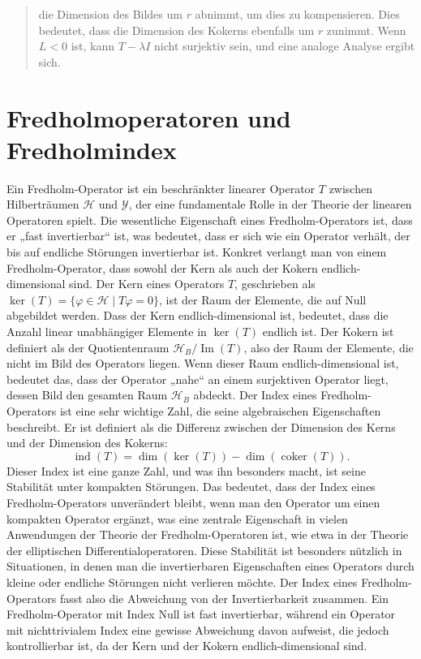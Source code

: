 \documentclass[11pt, hidelinks]{article}
\newcommand{\h}{\mathcal{H}}
\numberwithin{conj}{section}
\begin{document}
\begin{abstract}
die Dimension des Bildes um \(r\) abnimmt, um dies zu kompensieren. Dies bedeutet, dass die Dimension des Kokerns ebenfalls um \(r\) zunimmt. Wenn \(L < 0\) ist, kann \(T - \lambda I\) nicht surjektiv sein, und eine analoge Analyse ergibt sich.
\end{abstract}

\begin{Large}
\tableofcontents
\end{Large}

\onehalfspacing

\section{Fredholmoperatoren und Fredholmindex}
Ein Fredholm-Operator ist ein beschränkter linearer Operator \( T \) zwischen Hilberträumen \( \h \) und \( \mathcal{Y} \), der eine fundamentale Rolle in der Theorie der linearen Operatoren spielt. Die wesentliche Eigenschaft eines Fredholm-Operators ist, dass er „fast invertierbar“ ist, was bedeutet, dass er sich wie ein Operator verhält, der bis auf endliche Störungen invertierbar ist. Konkret verlangt man von einem Fredholm-Operator, dass sowohl der Kern als auch der Kokern endlich-dimensional sind. Der Kern eines Operators \( T \), geschrieben als \( \ker(T) = \{ \varphi \in \mathcal{H} \mid T\varphi = 0 \} \), ist der Raum der Elemente, die auf Null abgebildet werden. Dass der Kern endlich-dimensional ist, bedeutet, dass die Anzahl linear unabhängiger Elemente in \( \ker(T) \) endlich ist. Der Kokern ist definiert als der Quotientenraum \( \mathcal{H}_B / \operatorname{Im}(T) \), also der Raum der Elemente, die nicht im Bild des Operators liegen. Wenn dieser Raum endlich-dimensional ist, bedeutet das, dass der Operator „nahe“ an einem surjektiven Operator liegt, dessen Bild den gesamten Raum \( \mathcal{H}_B \) abdeckt. Der Index eines Fredholm-Operators ist eine sehr wichtige Zahl, die seine algebraischen Eigenschaften beschreibt. Er ist definiert als die Differenz zwischen der Dimension des Kerns und der Dimension des Kokerns:
\[
\operatorname{ind}(T) = \dim(\ker(T)) - \dim(\operatorname{coker}(T)).
\]
Dieser Index ist eine ganze Zahl, und was ihn besonders macht, ist seine Stabilität unter kompakten Störungen. Das bedeutet, dass der Index eines Fredholm-Operators unverändert bleibt, wenn man den Operator um einen kompakten Operator ergänzt, was eine zentrale Eigenschaft in vielen Anwendungen der Theorie der Fredholm-Operatoren ist, wie etwa in der Theorie der elliptischen Differentialoperatoren. Diese Stabilität ist besonders nützlich in Situationen, in denen man die invertierbaren Eigenschaften eines Operators durch kleine oder endliche Störungen nicht verlieren möchte. Der Index eines Fredholm-Operators fasst also die Abweichung von der Invertierbarkeit zusammen. Ein Fredholm-Operator mit Index Null ist fast invertierbar, während ein Operator mit nichttrivialem Index eine gewisse Abweichung davon aufweist, die jedoch kontrollierbar ist, da der Kern und der Kokern endlich-dimensional sind.
\end{document}
